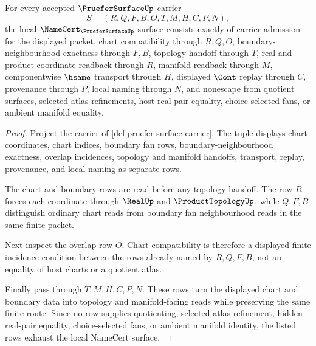 \begin{theorem}
\label{thm:pruefer-surface-namecert-obligations}
For every accepted $\PrueferSurfaceUp$ carrier
$$
S=(R,Q,F,B,O,T,M,H,C,P,N),
$$
the local $\NameCert_{\PrueferSurfaceUp}$ surface consists exactly of carrier admission for the displayed packet, chart compatibility through $R,Q,O$, boundary-neighbourhood exactness through $F,B$, topology handoff through $T$, real and product-coordinate readback through $R$, manifold readback through $M$, componentwise $\hsame$ transport through $H$, displayed $\Cont$ replay through $C$, provenance through $P$, local naming through $N$, and nonescape from quotient surfaces, selected atlas refinements, host real-pair equality, choice-selected fans, or ambient manifold equality.
\end{theorem}
\begin{proof}
Project the carrier of \autoref{def:pruefer-surface-carrier}. The tuple displays chart coordinates, chart indices, boundary fan rows, boundary-neighbourhood exactness, overlap incidences, topology and manifold handoffs, transport, replay, provenance, and local naming as separate rows.

The chart and boundary rows are read before any topology handoff. The row $R$ forces each coordinate through $\RealUp$ and $\ProductTopologyUp$, while $Q,F,B$ distinguish ordinary chart reads from boundary fan neighbourhood reads in the same finite packet.

Next inspect the overlap row $O$. Chart compatibility is therefore a displayed finite incidence condition between the rows already named by $R,Q,F,B$, not an equality of host charts or a quotient atlas.

Finally pass through $T,M,H,C,P,N$. These rows turn the displayed chart and boundary data into topology and manifold-facing reads while preserving the same finite route. Since no row supplies quotienting, selected atlas refinement, hidden real-pair equality, choice-selected fans, or ambient manifold identity, the listed rows exhaust the local NameCert surface.
\end{proof}

